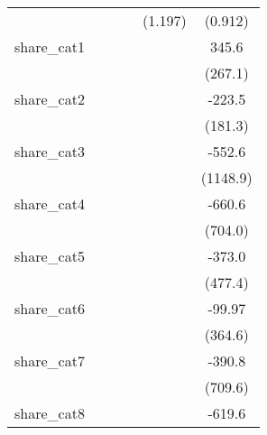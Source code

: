 {\begin{tabular}{l*{5}{c}}
            &                     &                     &                     &     (1.197)         &     (0.912)         \\
[1em]
share\_cat1  &                     &                     &                     &                     &       345.6         \\
            &                     &                     &                     &                     &     (267.1)         \\
[1em]
share\_cat2  &                     &                     &                     &                     &      -223.5         \\
            &                     &                     &                     &                     &     (181.3)         \\
[1em]
share\_cat3  &                     &                     &                     &                     &      -552.6         \\
            &                     &                     &                     &                     &    (1148.9)         \\
[1em]
share\_cat4  &                     &                     &                     &                     &      -660.6         \\
            &                     &                     &                     &                     &     (704.0)         \\
[1em]
share\_cat5  &                     &                     &                     &                     &      -373.0         \\
            &                     &                     &                     &                     &     (477.4)         \\
[1em]
share\_cat6  &                     &                     &                     &                     &      -99.97         \\
            &                     &                     &                     &                     &     (364.6)         \\
[1em]
share\_cat7  &                     &                     &                     &                     &      -390.8         \\
            &                     &                     &                     &                     &     (709.6)         \\
[1em]
share\_cat8  &                     &                     &                     &                     &      -619.6         \\

\end{tabular}}
